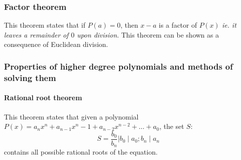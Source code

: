 \subsubsection{Factor theorem}
This theorem states that if $P(a) = 0$, then $x-a$ is a factor of $P(x)$ \textit{ie. it leaves a remainder of $0$ upon division}.
This theorem can be shown as a consequence of Euclidean division.

\subsubsection{Properties of higher degree polynomials and methods of solving them}
\paragraph{Rational root theorem}
This theorem states that given a polynomial $P(x) = a_nx^n + a_{n-1}x^n-1 + a_{n-2}x^{n-2} +\ldots +a_0$, the set $S$:
$$ S = {\dfrac{b_0}{b_n} | b_0\mid a_0; b_n\mid a_n} $$
contains all possible rational roots of the equation.
